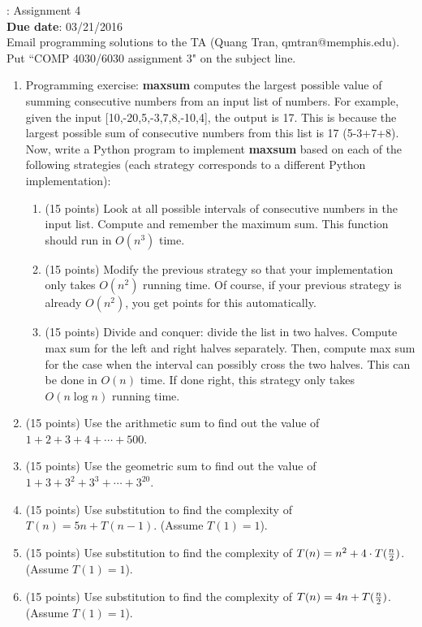\documentclass[11pt, oneside]{article}    %
\newcommand{\hw}[2]{\noindent {\bf COMP 4030/6030}: Assignment #1\\
{\bf Due date}: #2\\}
\begin{document}
\hw{4}{03/21/2016}

Email programming solutions to the TA (Quang Tran, qmtran@memphis.edu).  Put ``COMP 4030/6030 assignment 3" on the subject line.
\begin{enumerate}
	\item Programming exercise: {\bf maxsum} computes the largest possible value of summing consecutive numbers from an input list of numbers.  For example, given the input [10,-20,5,-3,7,8,-10,4], the output is 17.  This is because the largest possible sum of consecutive numbers from this list is 17 (5-3+7+8).  Now, write a Python program to implement {\bf maxsum} based on each of the following strategies (each strategy corresponds to a different Python implementation):
	\begin{enumerate}
	\item (15 points) Look at all possible intervals of consecutive numbers in the input list.  Compute and remember the maximum sum.  This function should run in $O(n^3)$ time.
	\item (15 points) Modify the previous strategy so that your implementation only takes $O(n^2)$ running time.  Of course, if your previous strategy is already $O(n^2)$, you get points for this automatically.
	\item (15 points) Divide and conquer: divide the list in two halves.  Compute max sum for the left and right halves separately.  Then, compute max sum for the case when the interval can possibly cross the two halves.  This can be done in $O(n)$ time.  If done right, this strategy only takes $O(n \log n)$ running time.
	\end{enumerate}
	
	\item (15 points) Use the arithmetic sum to find out the value of $1 + 2 + 3 + 4 + \cdots + 500$.
	\item (15 points) Use the geometric sum to find out the value of $1 + 3 + 3^2 + 3^3 + \cdots + 3^{20}$.
	\item (15 points) Use substitution to find the complexity of $T(n) = 5n + T(n-1)$. (Assume $T(1) = 1$).
	\item (15 points) Use substitution to find the complexity of $T(n) = n^2 + 4 \cdot T({n \over 2})$. (Assume $T(1) = 1$).
	\item (15 points) Use substitution to find the complexity of $T(n) = 4n + T({n \over 2})$.  (Assume $T(1) = 1$).
\end{enumerate}
\end{document}

